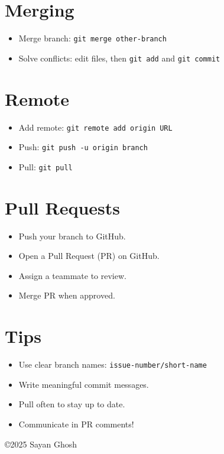 \documentclass[12pt,a4paper]{article}
\begin{document}

\section*{\textcolor{accent}{Merging}}
\begin{itemize}
  \item Merge branch: \texttt{git merge other-branch}
  \item Solve conflicts: edit files, then \texttt{git add} and \texttt{git commit}
\end{itemize}


\section*{\textcolor{accent}{Remote}}
\begin{itemize}
  \item Add remote: \texttt{git remote add origin URL}
  \item Push: \texttt{git push -u origin branch}
  \item Pull: \texttt{git pull}
\end{itemize}


\section*{\textcolor{accent}{Pull Requests}}
\begin{itemize}
  \item Push your branch to GitHub.
  \item Open a Pull Request (PR) on GitHub.
  \item Assign a teammate to review.
  \item Merge PR when approved.
\end{itemize}


\section*{\textcolor{accent}{Tips}}
\begin{itemize}
  \item Use clear branch names: \texttt{issue-number/short-name}
  \item Write meaningful commit messages.
  \item Pull often to stay up to date.
  \item Communicate in PR comments!
\end{itemize}


\vfill

\begin{center}
  {\small \copyright 2025 Sayan Ghosh}
\end{center}
\end{document}
